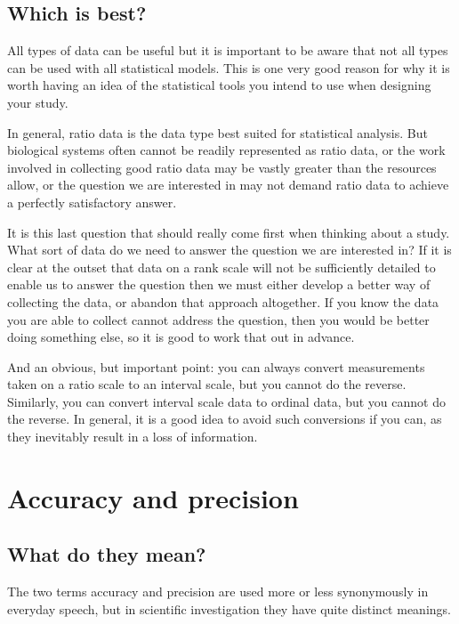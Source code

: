 \documentclass[]{book}
\begin{document}
\subsection{Which is best?}\label{which-is-best}

All types of data can be useful but it is important to be aware that not
all types can be used with all statistical models. This is one very good
reason for why it is worth having an idea of the statistical tools you
intend to use when designing your study.

In general, ratio data is the data type best suited for statistical
analysis. But biological systems often cannot be readily represented as
ratio data, or the work involved in collecting good ratio data may be
vastly greater than the resources allow, or the question we are
interested in may not demand ratio data to achieve a perfectly
satisfactory answer.

It is this last question that should really come first when thinking
about a study. What sort of data do we need to answer the question we
are interested in? If it is clear at the outset that data on a rank
scale will not be sufficiently detailed to enable us to answer the
question then we must either develop a better way of collecting the
data, or abandon that approach altogether. If you know the data you are
able to collect cannot address the question, then you would be better
doing something else, so it is good to work that out in advance.

And an obvious, but important point: you can always convert measurements
taken on a ratio scale to an interval scale, but you cannot do the
reverse. Similarly, you can convert interval scale data to ordinal data,
but you cannot do the reverse. In general, it is a good idea to avoid
such conversions if you can, as they inevitably result in a loss of
information.

\section{Accuracy and precision}\label{accuracy-precision}

\subsection{What do they mean?}\label{what-do-they-mean}

The two terms accuracy and precision are used more or less synonymously
in everyday speech, but in scientific investigation they have quite
distinct meanings.
\end{document}
